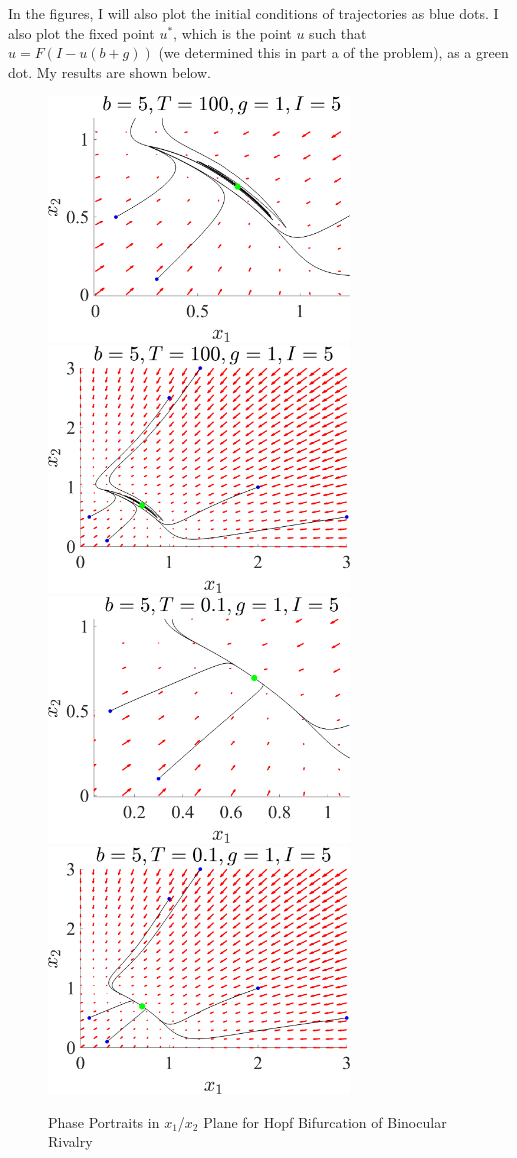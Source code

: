 \documentclass[11pt]{article}
\begin{document}
In the figures, I will also plot the initial conditions of trajectories as blue dots. I also plot the fixed point $u^*$, which is the point $u$ such that $u = F(I - u(b+g))$ (we determined this in part a of the problem), as a green dot. My results are shown below. 

\begin{figure}[h]
\centering
\includegraphics[width=8cm]{xs_HopfNeurons_b_5_T100_g1I_5_2.png}
\includegraphics[width=8cm]{xs_HopfNeurons_b_5_T100_g1I_5.png}
\includegraphics[width=8cm]{xs_HopfNeurons_b_5_T0.1_g1I_5_2.png}
\includegraphics[width=8cm]{xs_HopfNeurons_b_5_T0.1_g1I_5.png}
\caption{Phase Portraits in $x_1$/$x_2$ Plane for Hopf Bifurcation of Binocular Rivalry}
\end{figure}
\end{document}
